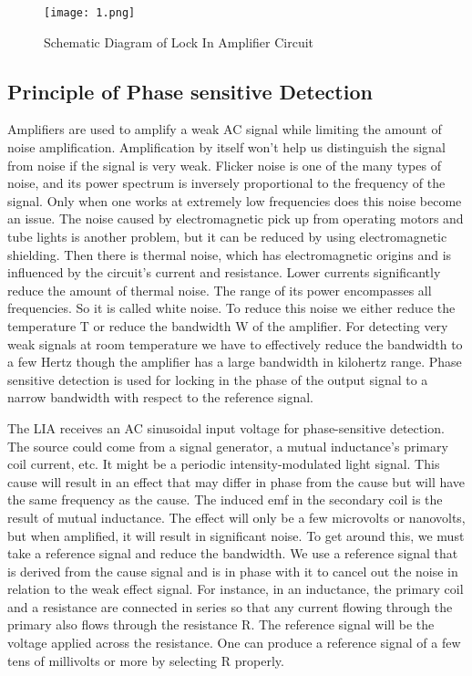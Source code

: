 	
		\begin{figure}[H]
			\centering
			\texttt{[image: 1.png]}
			\caption{Schematic Diagram of Lock In Amplifier Circuit}
			\label{fig:1}
		\end{figure}
	
	\subsection{Principle of Phase sensitive Detection}

		Amplifiers are used to amplify a weak AC signal while limiting the amount of noise amplification. Amplification by itself won't help us distinguish the signal from noise if the signal is very weak. Flicker noise is one of the many types of noise, and its power spectrum is inversely proportional to the frequency of the signal. Only when one works at extremely low frequencies does this noise become an issue. The noise caused by electromagnetic pick up from operating motors and tube lights is another problem, but it can be reduced by using electromagnetic shielding. Then there is thermal noise, which has electromagnetic origins and is influenced by the circuit's current and resistance. Lower currents significantly reduce the amount of thermal noise. The range of its power encompasses all frequencies. So it is called white noise. To reduce this noise we either reduce the temperature T or reduce the bandwidth W of the amplifier. For detecting very weak signals at room temperature we have to effectively reduce the bandwidth to a few Hertz though the amplifier has a large bandwidth in kilohertz range. Phase sensitive detection is used for locking in the phase of the output signal to a narrow bandwidth with respect to the reference signal.

		The LIA receives an AC sinusoidal input voltage for phase-sensitive detection. The source could come from a signal generator, a mutual inductance's primary coil current, etc. It might be a periodic intensity-modulated light signal. This cause will result in an effect that may differ in phase from the cause but will have the same frequency as the cause. The induced emf in the secondary coil is the result of mutual inductance. The effect will only be a few microvolts or nanovolts, but when amplified, it will result in significant noise. To get around this, we must take a reference signal and reduce the bandwidth. We use a reference signal that is derived from the cause signal and is in phase with it to cancel out the noise in relation to the weak effect signal. For instance, in an inductance, the primary coil and a resistance are connected in series so that any current flowing through the primary also flows through the resistance R. The reference signal will be the voltage applied across the resistance. One can produce a reference signal of a few tens of millivolts or more by selecting R properly.

